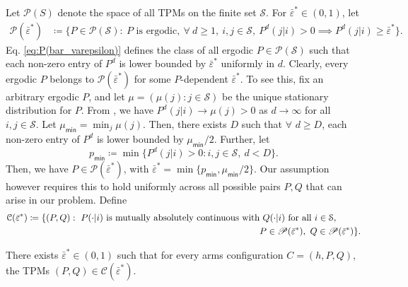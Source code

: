Let $\mathscr{P}({S})$ denote the space of all TPMs on the finite set $\mathcal{S}$. For $\bar{\varepsilon}^*\in (0,1)$, let
\begin{align}
	\mathscr{P}(\bar{\varepsilon}^*) &\coloneqq \{P\in \mathscr{P}(\mathcal{S}):~P\text{ is ergodic},~\forall~d\geq 1, ~i, j\in \mathcal{S},~ P^d(j|i)>0 \implies P^d(j|i) \geq \bar{\varepsilon}^*\}.
	\label{eq:P(bar_varepsilon)}
\end{align}
Eq. \eqref{eq:P(bar_varepsilon)} defines the class of all ergodic $P\in \mathscr{P}(\mathcal{S})$ such that each non-zero entry of $P^d$ is lower bounded by $\bar{\varepsilon}^*$ uniformly in $d$. Clearly, every ergodic $P$ belongs to $\mathscr{P}(\bar{\varepsilon}^*) $ for some $P$-dependent $\bar{\varepsilon}^*$. To see this, fix an arbitrary ergodic $P$, and let $\mu=(\mu(j):j\in \mathcal{S})$ be the unique stationary distribution for $P$. From \cite[Theorem 4.9]{levin2017markov}, we have $P^d(j|i)\to \mu(j)>0$ as $d\to \infty$ for all $i, j\in \mathcal{S}$. Let $\mu_{\textsf{min}}=\min_j \mu(j)$. Then, there exists $D$ such that $\forall$ $d\geq D$, each non-zero entry of $P^d$ is lower bounded by $\mu_{\textsf{min}}/2$. Further, let $$p_{\textsf{min}}\coloneqq \min\{P^d(j|i)> 0: i, j\in \mathcal{S}, ~d<D\}.$$ Then, we have $P\in \mathscr{P}(\bar{\varepsilon}^*)$, with $\bar{\varepsilon}^*=\min\{p_{\textsf{min}}, \mu_{\textsf{min}}/2\}$. Our assumption however requires this to hold uniformly across all possible pairs $P, Q$ that can arise  in our problem. Define
\begin{align}
	\mathcal{C}(\bar{\varepsilon}^*)&\coloneqq \{(P, Q):~P(\cdot|i)\text{ is mutually absolutely continuous with }Q(\cdot|i)\text{ for all }i\in \mathcal{S},\nonumber\\
	&\hspace{9cm} P\in \mathscr{P}(\bar{\varepsilon}^*), ~Q\in \mathscr{P}(\bar{\varepsilon}^*)\}.
	\label{eq:C(bar{varepsilon}^*)}
\end{align}

\begin{assumption}
\label{assmptn:technical_assumption_on_TPMs}
	There exists $\bar{\varepsilon}^*\in (0,1)$ such that for every arms configuration $C=(h, P, Q)$, the TPMs $(P, Q)\in \mathcal{C}(\bar{\varepsilon}^*)$.
\end{assumption}

